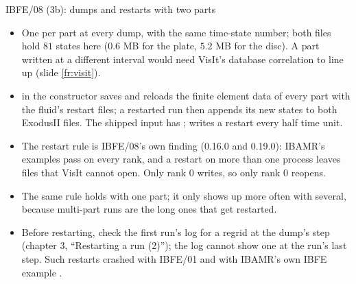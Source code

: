\documentclass[aspectratio=169,11pt]{beamer}
\begin{document}
\begin{frame}{IBFE/08 (3b): dumps and restarts with two parts}
\label{fr:restart}
\footnotesize
\begin{itemize}
  \item One  per part at every dump, with the same time-state number; both files hold $81$ states here ($0.6$ MB for the plate, $5.2$ MB for the disc). A part written at a different interval would need VisIt's database correlation to line up (slide \ref{fr:visit}).
  \item {} in the constructor saves and reloads the finite element data of every part with the fluid's restart files; a restarted run then appends its new states to both ExodusII files. The shipped input has ;  writes a restart every half time unit.
  \item The restart rule is IBFE/08's own finding (0.16.0 and 0.19.0): IBAMR's examples pass  on every rank, and a restart on more than one process leaves files that VisIt cannot open. Only rank $0$ writes, so only rank $0$ reopens.
  \item The same rule holds with one part; it only shows up more often with several, because multi-part runs are the long ones that get restarted.
  \item Before restarting, check the first run's log for a regrid at the dump's step (chapter 3, ``Restarting a run (2)''); the log cannot show one at the run's last step. Such restarts crashed with IBFE/01 and with IBAMR's own IBFE example .
\end{itemize}
\end{frame}
\end{document}
